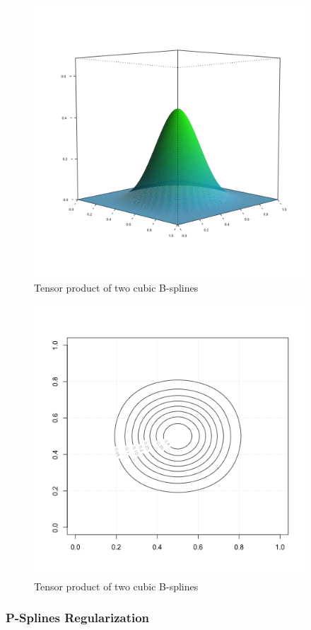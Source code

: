\documentclass[12pt]{article}
\newcommand*\outlineskeleton{\color{green}}
\begin{document}
\begin{figure}[H]
  \centering
 \graphicspath{{img/}}
  \includegraphics[width=4in, height=4in]{bicubic_bspline.png}
  \caption{Tensor product of two cubic B-splines}\label{bicubic_bspline}
\end{figure}

\begin{figure}[H]
  \centering
  \graphicspath{{img/}}
  \includegraphics[width=4in, height=4in]{bicubic_bspline_contour.png}
  \caption{Tensor product of two cubic B-splines}\label{bicubic_bspline_contour}
\end{figure}

\subsubsection{{\outlineskeleton P-Splines Regularization}}
\end{document}
